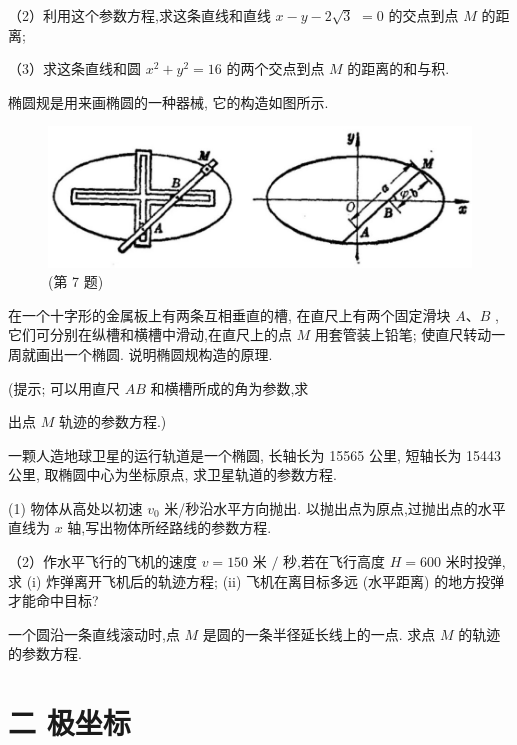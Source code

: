 \documentclass[lang=cn,newtx,10pt,scheme=chinese]{elegantbook}
\begin{document}
\begin{problemset}[习 题 十 三]
（2）利用这个参数方程,求这条直线和直线 \(x - y - 2\sqrt{3}\) \(= 0\) 的交点到点 \(M\) 的距离;

（3）求这条直线和圆 \({x}^{2} + {y}^{2} = {16}\) 的两个交点到点 \(M\) 的距离的和与积.

\item 椭圆规是用来画椭圆的一种器械, 它的构造如图所示.

\begin{figure}[h]
  \centering
  \includegraphics[max width=1.0\textwidth]{images/01912cc2-ffb6-728e-9ae7-b113ff05c64b_172_463830.jpg}
  \caption{(第 7 题)}
\end{figure}



在一个十字形的金属板上有两条互相垂直的槽, 在直尺上有两个固定滑块 \(A\text{、}B\) ,它们可分别在纵槽和横槽中滑动,在直尺上的点 \(M\) 用套管装上铅笔; 使直尺转动一周就画出一个椭圆. 说明椭圆规构造的原理.

(提示; 可以用直尺 \({AB}\) 和横槽所成的角为参数,求

出点 \(M\) 轨迹的参数方程.)

\item 一颗人造地球卫星的运行轨道是一个椭圆, 长轴长为 15565 公里, 短轴长为 15443 公里, 取椭圆中心为坐标原点, 求卫星轨道的参数方程.

\item (1) 物体从高处以初速 \({v}_{0}\) 米/秒沿水平方向抛出. 以抛出点为原点,过抛出点的水平直线为 \(x\) 轴,写出物体所经路线的参数方程.

（2）作水平飞行的飞机的速度 \(v = {150}\) 米 \(/\) 秒,若在飞行高度 \(H = {600}\) 米时投弹,求 (i) 炸弹离开飞机后的轨迹方程; (ii) 飞机在离目标多远 (水平距离) 的地方投弹才能命中目标?

\item *一个圆沿一条直线滚动时,点 \(M\) 是圆的一条半径延长线上的一点. 求点 \(M\) 的轨迹的参数方程.

\end{problemset}

\section*{二 极坐标}
\end{document}
